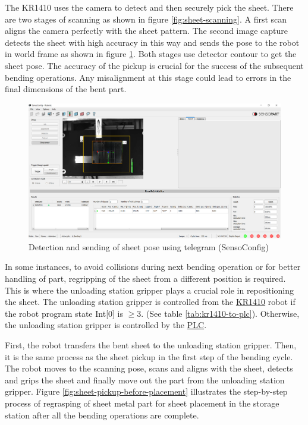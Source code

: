 The KR1410 uses the camera to detect and then securely pick the sheet. There are two stages of scanning as shown in figure \ref{fig:sheet-scanning}. A first scan aligns the camera perfectly with the sheet pattern. The second image capture detects the sheet with high accuracy in this way and sends the pose to the robot in world frame as shown in figure \ref{fig:sensoconfig-pattern}. Both stages use detector contour to get the sheet pose.
The accuracy of the pickup is crucial for the success of the subsequent bending operations. Any misalignment at this stage could lead to errors in the final dimensions of the bent part.

\begin{figure}[h]
    \centering
    \includegraphics[width=\textwidth]{figures/sheet-pickup/sensoconfig.PNG}
    \caption{Detection and sending of sheet pose using telegram (SensoConfig)}
    \label{fig:sensoconfig-pattern}
\end{figure}

In some instances, to avoid collisions during next bending operation or for better handling of part, regripping of the sheet from a different position is required. This is where the unloading station gripper plays a crucial role in repositioning the sheet. The unloading station gripper is controlled from the \hyperref[acro:KR]{KR1410} robot if the robot program state Int[0] is $\ge$3. (See table \ref{tab:kr1410-to-plc}). Otherwise, the unloading station gripper is controlled by the \hyperref[acro:PLC]{PLC}. 
\vspace{1\baselineskip}

First, the robot transfers the bent sheet to the unloading station gripper. Then, it is the same process as the sheet pickup in the first step of the bending cycle. The robot moves to the scanning pose, scans and aligns with the sheet, detects and grips the sheet and finally move out the part from the unloading station gripper.
Figure \ref{fig:sheet-pickup-before-placement} illustrates the step-by-step process of regrasping of sheet metal part for sheet placement in the storage station after all the bending operations are complete.


